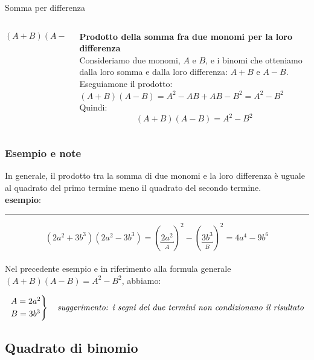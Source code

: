 \documentclass[10pt, aspectratio=169]{beamer}
\begin{document}
\begin{frame}{Somma per differenza}
    \begin{columns}
        
        \begin{column}{0.5\textwidth}
            \Large{$$ (A+B)(A-B) = A^2 - B^2$$}
        \end{column}

        \begin{column}{0.5\textwidth}
        {\textbf{Prodotto della somma fra due monomi per la loro differenza}}\\[10pt]

        \small{Consideriamo due monomi, $A$ e $B$, e i binomi che otteniamo dalla loro somma e dalla loro differenza: $A+B$ e $A-B$.\\
        Eseguiamone il prodotto: $(A+B)(A-B)=A^2-A B+A B-B^2=A^2-B^2$\\ [10pt]
        Quindi:}
$$
(A+B)(A-B)=A^2-B^2
$$

        \end{column}
    \end{columns}
\end{frame}

\begin{frame}
    \frametitle{Esempio e note}

    In generale, il prodotto tra la somma di due monomi e la loro differenza è uguale al quadrato del primo termine meno il quadrato del secondo termine. \\[10pt]
\textbf{esempio}:
\hrule

$$\left(2 a^2+3 b^3\right)\left(2 a^2-3 b^3\right)=(\underbracket{2 a^2}_{A})^2- (\underbracket{3 b^3}_{B})^2=4 a^4-9 b^6$$\\[10pt]

Nel precedente esempio e in riferimento alla formula generale $(A+B)(A-B)=A^2-B^2$, abbiamo:

\[
\begin{rcases*}
    A = 2a^2\\
    B= 3b^3
\end{rcases*} \quad {\textit{suggerimento: i segni dei due termini non condizionano il risultato}} 
\]


\end{frame}



\subsection{Quadrato di binomio}
\end{document}
